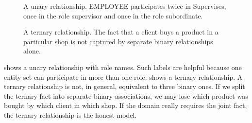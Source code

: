 \documentclass[11pt,a4paper,openany]{book}
\begin{document}
\begin{figure}[tbp]
\centering
\begin{minipage}[t]{0.47\linewidth}
\centering
\begin{adjustbox}{max width=\linewidth,max totalheight=0.24\textheight,center}
\end{adjustbox}
\caption{A unary relationship. EMPLOYEE participates twice in Supervises, once in the role supervisor and once in the role subordinate.}
\label{fig:er-unary-supervises}
\end{minipage}\hfill
\begin{minipage}[t]{0.47\linewidth}
\centering
\begin{adjustbox}{max width=\linewidth,max totalheight=0.24\textheight,center}
\end{adjustbox}
\caption{A ternary relationship. The fact that a client buys a product in a particular shop is not captured by separate binary relationships alone.}
\label{fig:er-ternary-buys}
\end{minipage}
\end{figure}

 shows a unary relationship with role names. Such labels are helpful because one entity set can participate in more than one role.  shows a ternary relationship. A ternary relationship is not, in general, equivalent to three binary ones. If we split the ternary fact into separate binary associations, we may lose which product was bought by which client in which shop. If the domain really requires the joint fact, the ternary relationship is the honest model.
\end{document}

